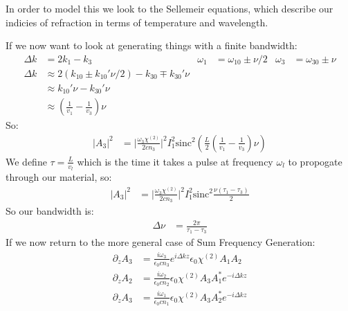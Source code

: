 In order to model this we look to the Sellemeir equations, which describe our indicies of refraction in terms of temperature and wavelength.

If we now want to look at generating things with a finite bandwidth:
\begin{align*}
	\Delta k &= 2k_1 -k_3 & \omega_1 &= \omega_{10} \pm \nu/2 & \omega_3 &= \omega_{30} \pm \nu \\
	\Delta k &\approx 2(k_{10} \pm k_{10}' \nu/2) - k_{30} \mp k_{30}'\nu \\
	&\approx k_{10}' \nu - k_{30}'\nu \\
	&\approx \left(\frac{1}{v_1} - \frac{1}{v_3}\right)\nu
\end{align*}
So:
\begin{align*}
	|A_3|^2 &= \Big|\frac{\omega_3\chi^{(2)}}{2cn_3}\Big|^2 I_1^2 \text{sinc}^2\left(\frac{L}{2}\left(\frac{1}{v_1} - \frac{1}{v_3}\right)\nu\right)
\end{align*}
We define $\tau = \frac{L}{v_l}$ which is the time it takes a pulse at frequency $\omega_l$ to propogate through our material, so:
\begin{align*}
	|A_3|^2 &= \Big|\frac{\omega_3\chi^{(2)}}{2cn_3}\Big|^2 I_1^2 \text{sinc}^2\frac{\nu (\tau_1-\tau_3)}{2}
\end{align*}
So our bandwidth is:
\begin{align*}
	\Delta\nu &= \frac{2\pi}{\tau_1-\tau_3}
\end{align*}
If we now return to the more general case of Sum Frequency Generation:
\begin{align*}
	\partial_z A_3 &= \frac{i\omega_3}{\epsilon_0 cn_3} e^{i\Delta k z} \epsilon_0 \chi^{(2)} A_1 A_2 \\
	\partial_z A_2 &= \frac{i\omega_2}{\epsilon_0 cn_2} \epsilon_0 \chi^{(2)} A_3 A_1^* e^{-i\Delta k z} \\
	\partial_z A_3 &= \frac{i\omega_1}{\epsilon_0 cn_1} \epsilon_0 \chi^{(2)} A_3 A_2^* e^{-i\Delta k z}
\end{align*}
